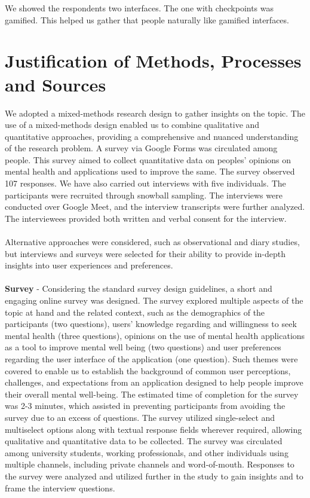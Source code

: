 \documentclass[manuscript,screen,review]{acmart}
\begin{document}
We showed the respondents two interfaces. The one with checkpoints was
gamified. This helped us gather that people naturally like gamified
interfaces.

\newpage

\section{Justification of Methods, Processes and Sources}

We adopted a mixed-methods research design to gather insights on the topic. The use of a mixed-methods design enabled us to combine qualitative and quantitative approaches, providing a comprehensive and nuanced understanding of the research problem. A survey via Google Forms was circulated among people. This survey aimed to collect quantitative data on peoples' opinions on mental health and applications used to improve the same. The survey observed 107 responses. We have also carried out interviews with five individuals. The participants were recruited through snowball sampling. The interviews were conducted over Google Meet, and the interview transcripts were further analyzed. The interviewees provided both written and verbal consent for the interview.
\\ \\
Alternative approaches were considered, such as observational and diary studies, but interviews and surveys were selected for their ability to provide in-depth insights into user experiences and preferences.
\\ \\ 
\textbf{Survey} - Considering the standard survey design guidelines, a short and engaging online survey was designed. The survey explored multiple aspects of the topic at hand and the related context, such as the demographics of the participants (two questions), users' knowledge regarding and willingness to seek mental health (three questions), opinions on the use of mental health applications as a tool to improve mental well being (two questions) and user preferences regarding the user interface of the application (one question). Such themes were covered to enable us to establish the background of common user perceptions, challenges, and expectations from an application designed to help people improve their overall mental well-being. The estimated time of completion for the survey was 2-3 minutes, which assisted in preventing participants from avoiding the survey due to an excess of questions. The survey utilized single-select and multiselect options along with textual response fields wherever required, allowing qualitative and quantitative data to be collected. The survey was circulated among university students, working professionals, and other individuals using multiple channels, including private channels and word-of-mouth. Responses to the survey were analyzed and utilized further in the study to gain insights and to frame the interview questions.
\end{document}
